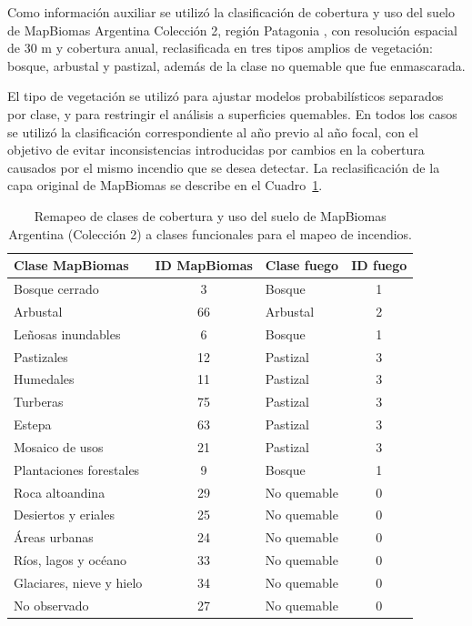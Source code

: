 \documentclass[11pt,a4paper]{article}
\begin{document}
Como información auxiliar se utilizó la clasificación de cobertura y uso del suelo de MapBiomas Argentina Colección 2, región Patagonia \parencite{mapbiomasarg}, con resolución espacial de 30 m y cobertura anual, reclasificada en tres tipos amplios de vegetación: bosque, arbustal y pastizal, además de la clase no quemable que fue enmascarada.

El tipo de vegetación se utilizó para ajustar modelos probabilísticos separados por clase, y para restringir el análisis a superficies quemables. En todos los casos se utilizó la clasificación correspondiente al año previo al año focal, con el objetivo de evitar inconsistencias introducidas por cambios en la cobertura causados por el mismo incendio que se desea detectar. La reclasificación de la capa original de MapBiomas se describe en el Cuadro~\ref{tab-remapeo-clases}.

\begin{table}[ht]
\centering
\caption{Remapeo de clases de cobertura y uso del suelo de MapBiomas Argentina (Colección 2) a clases funcionales para el mapeo de incendios.}
\label{tab-remapeo-clases}
\begin{tabular}{l c l c}
\toprule
Clase MapBiomas & ID MapBiomas & Clase fuego & ID fuego \\
\midrule
Bosque cerrado          & 3  & Bosque      & 1 \\
Arbustal                & 66 & Arbustal    & 2 \\
Leñosas inundables      & 6  & Bosque      & 1 \\
Pastizales              & 12 & Pastizal    & 3 \\
Humedales               & 11 & Pastizal    & 3 \\
Turberas                & 75 & Pastizal    & 3 \\
Estepa                  & 63 & Pastizal    & 3 \\
Mosaico de usos         & 21 & Pastizal    & 3 \\
Plantaciones forestales & 9  & Bosque      & 1 \\
Roca altoandina         & 29 & No quemable & 0 \\
Desiertos y eriales     & 25 & No quemable & 0 \\
Áreas urbanas           & 24 & No quemable & 0 \\
Ríos, lagos y océano    & 33 & No quemable & 0 \\
Glaciares, nieve y hielo& 34 & No quemable & 0 \\
No observado            & 27 & No quemable & 0 \\
\bottomrule
\end{tabular}
\end{table}
\end{document}
